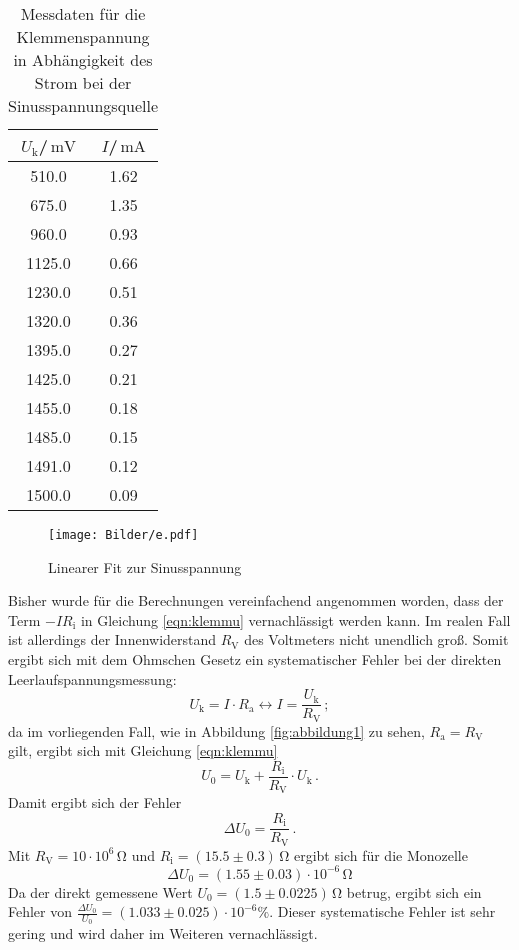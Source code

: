 \begin{table}
  \centering
  \caption{Messdaten für die Klemmenspannung in Abhängigkeit des Strom bei der Sinusspannungsquelle}
  \label{tab:sinus}

\begin{tabular}{cc}
  \toprule
$U_\text{k}$/$\,\si{\milli\volt}$ & $I$/$\,\si{\milli\ampere}$\\
\midrule
510.0 & 1.62 \\
675.0 & 1.35 \\
960.0 & 0.93 \\
1125.0 & 0.66 \\
1230.0 & 0.51 \\
1320.0 & 0.36 \\
1395.0 & 0.27 \\
1425.0 & 0.21 \\
1455.0 & 0.18 \\
1485.0 & 0.15 \\
1491.0 & 0.12 \\
1500.0 & 0.09 \\
\bottomrule
\end{tabular}
\end{table}
\begin{figure}
\texttt{[image: Bilder/e.pdf]}
\caption{Linearer Fit zur Sinusspannung}
\label{fig:plot_sinus}
\end{figure}
Bisher wurde für die Berechnungen vereinfachend angenommen worden,
dass der Term $-IR_\text{i}$ in Gleichung \eqref{eqn:klemmu} vernachlässigt werden kann. Im realen Fall ist allerdings der Innenwiderstand $R_\text{V}$ des Voltmeters nicht unendlich groß.
Somit ergibt sich mit dem Ohmschen Gesetz ein systematischer Fehler bei der direkten Leerlaufspannungsmessung:
\begin{equation*}
  U_\text{k}=I\cdot R_\text{a} \leftrightarrow I=\frac{U_\text{k}}{R_\text{V}}\, ;
\end{equation*}
da im vorliegenden Fall, wie in Abbildung \ref{fig:abbildung1} zu sehen, $R_\text{a}=R_\text{V}$ gilt, ergibt sich mit Gleichung \eqref{eqn:klemmu}
\begin{equation*}
U_\text{0}=U_\text{k}+\frac{R_\text{i}}{R_\text{V}}\cdot U_\text{k}\, .
\end{equation*}
Damit ergibt sich der Fehler
\begin{equation*}
  \Delta  U_\text{0}=\frac{R_\text{i}}{R_\text{V}} \, .
\end{equation*}
Mit $R_\text{V}=10 \cdot 10^6 \,\si{\ohm}$ und $R_\text{i}=(15.5\pm0.3)\,\si{\ohm}$ ergibt sich für die Monozelle
\begin{equation*}
\Delta U_\text{0}= (1.55 \pm 0.03)\cdot 10^{-6}\, \si{\ohm}
\end{equation*}
Da der direkt gemessene Wert $U_\text{0}=(1.5 \pm 0.0225)\, \si{\ohm}$ betrug, ergibt sich ein Fehler von $\frac{\Delta U_\text{0}}{U_\text{0}}=(1.033\pm0.025)\cdot 10^{-6} \%$.
Dieser systematische Fehler ist sehr gering und wird daher im Weiteren vernachlässigt.

